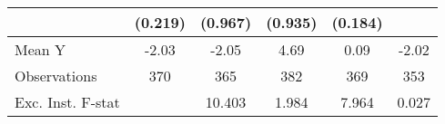 {\begin{tabular}{l*{5}{c}}
            &     (0.219)         &     (0.967)         &     (0.935)         &     (0.184)         &                     \\
\midrule
Mean Y      &       -2.03         &       -2.05         &        4.69         &        0.09         &       -2.02         \\
Observations&         370         &         365         &         382         &         369         &         353         \\
Exc. Inst. F-stat&                     &      10.403         &       1.984         &       7.964         &       0.027         \\
\bottomrule
\end{tabular}
}
